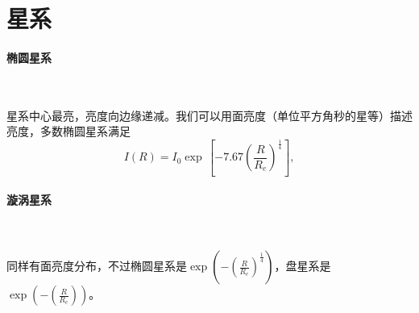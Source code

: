 \documentclass[../天体物理基础.tex]{subfiles}
\begin{document}
\section{星系}
\paragraph{椭圆星系}~{}

星系中心最亮，亮度向边缘递减。我们可以用面亮度（单位平方角秒的星等）描述亮度，多数椭圆星系满足
\begin{equation}
I(R)=I_{0}\exp\,[-7.67(\frac{R}{R_{e}})^{\frac14}],
\end{equation}

\paragraph{漩涡星系}~{}


同样有面亮度分布，不过椭圆星系是$\exp\left(-\left(\frac{R}{R_{e}}\right)^{\frac14}\right)$，盘星系是$\exp\left(-\left(\frac{R}{R_{e}}\right)\right)$。


\printbibliography
\end{document}
